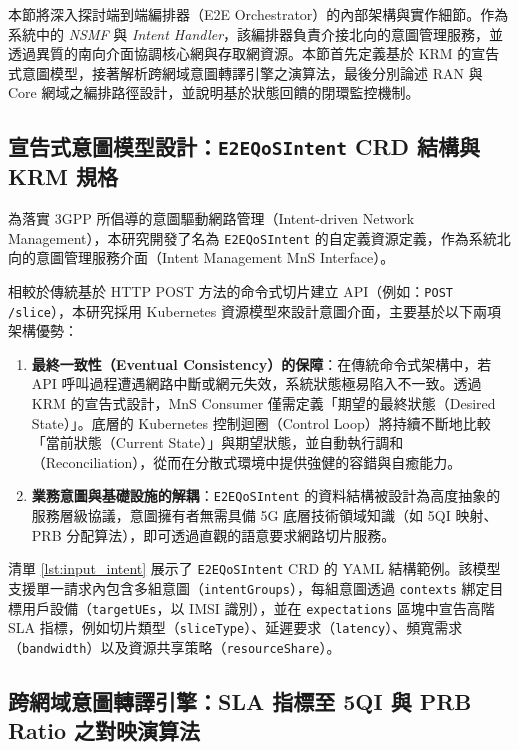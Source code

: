 本節將深入探討端到端編排器（E2E Orchestrator）的內部架構與實作細節。作為系統中的 \textit{NSMF} 與 \textit{Intent Handler}，該編排器負責介接北向的意圖管理服務，並透過異質的南向介面協調核心網與存取網資源。本節首先定義基於 KRM 的宣告式意圖模型，接著解析跨網域意圖轉譯引擎之演算法，最後分別論述 RAN 與 Core 網域之編排路徑設計，並說明基於狀態回饋的閉環監控機制。

\subsection{宣告式意圖模型設計：\texttt{E2EQoSIntent} CRD 結構與 KRM 規格}
\label{subsec:intent_crd}

為落實 3GPP 所倡導的意圖驅動網路管理（Intent-driven Network Management），本研究開發了名為 \texttt{E2EQoSIntent} 的自定義資源定義，作為系統北向的意圖管理服務介面（Intent Management MnS Interface）。

相較於傳統基於 HTTP POST 方法的命令式切片建立 API（例如：\texttt{POST /slice}），本研究採用 Kubernetes 資源模型來設計意圖介面，主要基於以下兩項架構優勢：
\begin{enumerate}
    \item \textbf{最終一致性（Eventual Consistency）的保障}：在傳統命令式架構中，若 API 呼叫過程遭遇網路中斷或網元失效，系統狀態極易陷入不一致。透過 KRM 的宣告式設計，MnS Consumer 僅需定義「期望的最終狀態（Desired State）」。底層的 Kubernetes 控制迴圈（Control Loop）將持續不斷地比較「當前狀態（Current State）」與期望狀態，並自動執行調和（Reconciliation），從而在分散式環境中提供強健的容錯與自癒能力。
    \item \textbf{業務意圖與基礎設施的解耦}：\texttt{E2EQoSIntent} 的資料結構被設計為高度抽象的服務層級協議，意圖擁有者無需具備 5G 底層技術領域知識（如 5QI 映射、PRB 分配算法），即可透過直觀的語意要求網路切片服務。
\end{enumerate}

清單 \ref{lst:input_intent} 展示了 \texttt{E2EQoSIntent} CRD 的 YAML 結構範例。該模型支援單一請求內包含多組意圖（\texttt{intentGroups}），每組意圖透過 \texttt{contexts} 綁定目標用戶設備（\texttt{targetUEs}，以 IMSI 識別），並在 \texttt{expectations} 區塊中宣告高階 SLA 指標，例如切片類型（\texttt{sliceType}）、延遲要求（\texttt{latency}）、頻寬需求（\texttt{bandwidth}）以及資源共享策略（\texttt{resourceShare}）。


\subsection{跨網域意圖轉譯引擎：SLA 指標至 5QI 與 PRB Ratio 之對映演算法}
\label{subsec:intent_translation}

